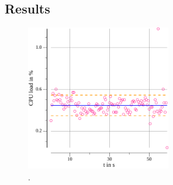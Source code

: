 \subsection{Results}
\begin{figure}[!t]
	\centering
	\includegraphics[width=2.5in]{img/1cpu2c1Mb_cm.pdf}
	\caption{.}
	\label{fig_c_experiment}
\end{figure}

